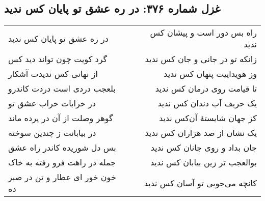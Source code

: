 \begin{center}
\section*{غزل شماره ۳۷۶: در ره عشق تو پایان کس ندید}
\label{sec:376}
\begin{longtable}{l p{0.5cm} r}
در ره عشق تو پایان کس ندید
&&
راه بس دور است و پیشان کس ندید
\\
گرد کویت چون تواند دید کس
&&
زانکه تو در جانی و جان کس ندید
\\
از نهانی کس ندیدت آشکار
&&
وز هویداییت پنهان کس ندید
\\
بلعجب دردی است دردت کاندرو
&&
تا قیامت روی درمان کس ندید
\\
در خرابات خراب عشق تو
&&
یک حریف آب دندان کس ندید
\\
گوهر وصلت از آن در پرده ماند
&&
کز جهان شایستهٔ آن‌کس ندید
\\
در بیابانت ز چندین سوخته
&&
یک نشان از صد هزاران کس ندید
\\
بس دل شوریده کاندر راه عشق
&&
جان بداد و روی جانان کس ندید
\\
جمله در راهت فرو رفته به خاک
&&
بوالعجب تر زین بیابان کس ندید
\\
خون خور ای عطار و تن در صبر ده
&&
کانچه می‌جویی تو آسان کس ندید
\\
\end{longtable}
\end{center}
